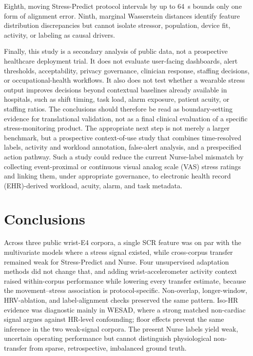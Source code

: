 \documentclass[healthcare,article,submit,moreauthors,pdftex]{Definitions/mdpi}
\begin{document}
Eighth, moving Stress-Predict protocol intervals by up to 64~s bounds only one
form of alignment error. Ninth, marginal Wasserstein distances identify feature
distribution discrepancies but cannot isolate stressor, population, device fit,
activity, or labeling as causal drivers.

Finally, this study is a secondary analysis of public data, not a prospective
healthcare deployment trial. It does not evaluate user-facing dashboards, alert
thresholds, acceptability, privacy governance, clinician response, staffing
decisions, or occupational-health workflows. It also does not test whether a
wearable stress output improves decisions beyond contextual baselines already
available in hospitals, such as shift timing, task load, alarm exposure, patient
acuity, or staffing ratios. The conclusions should therefore be read as
boundary-setting evidence for translational validation, not as a final clinical
evaluation of a specific stress-monitoring product. The appropriate next step is
not merely a larger benchmark, but a prospective context-of-use study that
combines time-resolved labels, activity and workload annotation, false-alert
analysis, and a prespecified action pathway. Such a study could reduce the
current Nurse-label mismatch by collecting event-proximal or continuous visual
analog scale (VAS) stress ratings and linking them, under appropriate governance,
to electronic health record (EHR)-derived workload, acuity, alarm, and task
metadata.

\section{Conclusions}

Across three public wrist-E4 corpora, a single SCR feature was on par with the
multivariate models where a stress signal existed, while cross-corpus transfer
remained weak for Stress-Predict and Nurse. Four unsupervised adaptation methods
did not change that, and adding wrist-accelerometer activity context raised
within-corpus performance while lowering every transfer estimate, because the
movement--stress association is protocol-specific. Non-overlap, longer-window,
HRV-ablation, and label-alignment checks preserved the same pattern.
Iso-HR evidence was diagnostic mainly in WESAD, where a strong matched
non-cardiac signal argues against HR-level confounding; floor effects prevent the
same inference in the two weak-signal corpora. The present Nurse labels yield
weak, uncertain operating performance but cannot distinguish physiological
non-transfer from sparse, retrospective, imbalanced ground truth.
\end{document}
